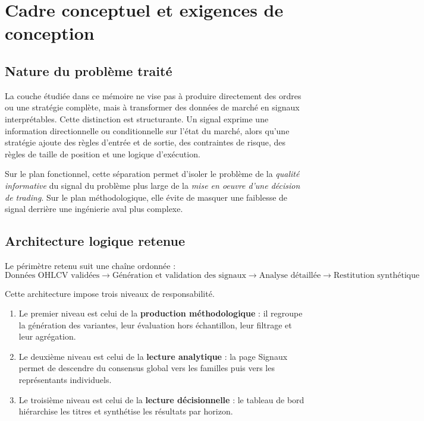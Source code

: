 \chapter{Cadre conceptuel et exigences de conception}

\section{Nature du problème traité}
La couche étudiée dans ce mémoire ne vise pas à produire directement des ordres
ou une stratégie complète, mais à transformer des données de marché en signaux
interprétables. Cette distinction est structurante. Un signal exprime une
information directionnelle ou conditionnelle sur l'état du marché, alors qu'une
stratégie ajoute des règles d'entrée et de sortie, des contraintes de risque,
des règles de taille de position et une logique d'exécution.

Sur le plan fonctionnel, cette séparation permet d'isoler le problème de la
\emph{qualité informative} du signal du problème plus large de la \emph{mise en
oeuvre d'une décision de trading}. Sur le plan méthodologique, elle évite de
masquer une faiblesse de signal derrière une ingénierie aval plus complexe.

\section{Architecture logique retenue}
Le périmètre retenu suit une chaîne ordonnée :
\[
\text{Données OHLCV validées} \rightarrow \text{Génération et validation des signaux}
\rightarrow \text{Analyse détaillée} \rightarrow \text{Restitution synthétique}
\]

Cette architecture impose trois niveaux de responsabilité.
\begin{enumerate}
\item Le premier niveau est celui de la \textbf{production méthodologique} : il
regroupe la génération des variantes, leur évaluation hors échantillon, leur
filtrage et leur agrégation.
\item Le deuxième niveau est celui de la \textbf{lecture analytique} : la page
Signaux permet de descendre du consensus global vers les familles puis vers les
représentants individuels.
\item Le troisième niveau est celui de la \textbf{lecture décisionnelle} : le
tableau de bord hiérarchise les titres et synthétise les résultats par horizon.
\end{enumerate}

